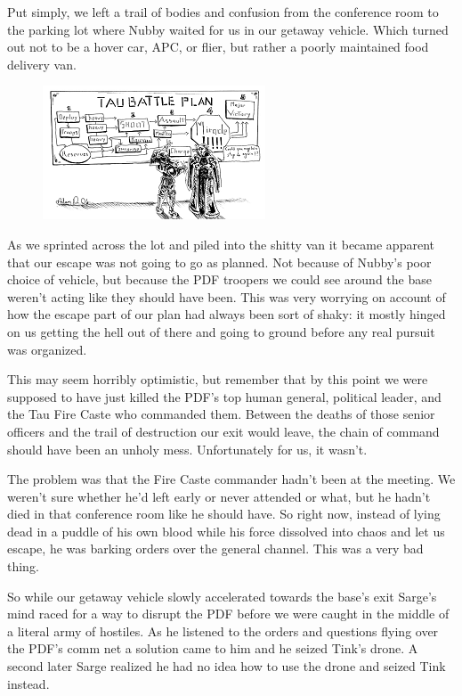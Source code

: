 Put simply, we left a trail of bodies and confusion from the conference room to the parking lot where Nubby waited for us in our getaway vehicle. 
Which turned out not to be a hover car, APC, or flier, but rather a poorly maintained food delivery van.

\begin{figure}
	\begin{center}
		\includegraphics[width=\figwidth]{pics/10/65.png}
	\end{center}
\end{figure}
As we sprinted across the lot and piled into the shitty van it became apparent that our escape was not going to go as planned. 
Not because of Nubby's poor choice of vehicle, but because the PDF troopers we could see around the base weren't acting like they should have been. 
This was very worrying on account of how the escape part of our plan had always been sort of shaky: 
it mostly hinged on us getting the hell out of there and going to ground before any real pursuit was organized. 


This may seem horribly optimistic, but remember that by this point we were supposed to have just killed the PDF's top human general, political leader, and the Tau Fire Caste who commanded them. 
Between the deaths of those senior officers and the trail of destruction our exit would leave, the chain of command should have been an unholy mess. 
Unfortunately for us, it wasn't. 


The problem was that the Fire Caste commander hadn't been at the meeting. 
We weren't sure whether he'd left early or never attended or what, but he hadn't died in that conference room like he should have. 
So right now, instead of lying dead in a puddle of his own blood while his force dissolved into chaos and let us escape, he was barking orders over the general channel. 
This was a very bad thing.

So while our getaway vehicle slowly accelerated towards the base's exit Sarge's mind raced for a way to disrupt the PDF before we were caught in the middle of a literal army of hostiles. 
As he listened to the orders and questions flying over the PDF's comm net a solution came to him and he seized Tink's drone. 
A second later Sarge realized he had no idea how to use the drone and seized Tink instead.

